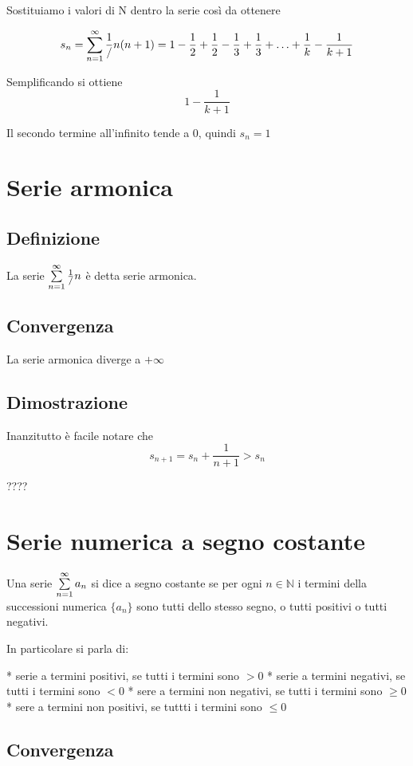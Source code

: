 Sostituiamo i valori di N dentro la serie così da ottenere

$$s_{n} = \sum\limits_{n=1}^{\infty}\frac{1}/{n(n+1)} = 1 - \frac{1}{2} + \frac{1}{2} - \frac{1}{3} + \frac{1}{3} + \ldots + \frac{1}{k} - \frac{1}{k+1}$$

Semplificando si ottiene $$1-\frac{1}{k+1}$$

Il secondo termine all'infinito tende a 0, quindi $s_{n} = 1$

\section{Serie armonica}

\subsection{Definizione}
La serie $\sum\limits_{n=1}^{\infty}\frac{1}/{n}$ è detta serie armonica.

\subsection{Convergenza}
La serie armonica diverge a $+\infty$

\subsection{Dimostrazione}
Inanzitutto è facile notare che $$s_{n+1}=s_n+\frac{1}{n+1} > s_n$$

????

\section{Serie numerica a segno costante}

Una serie $\sum\limits_{n=1}^{\infty}a_n$ si dice a segno costante se per ogni $n \in \mathbb{N}$ i termini della successioni numerica $\{a_n\}$ sono tutti dello stesso segno, o tutti positivi o tutti negativi. 

In particolare si parla di:

* serie a termini positivi, se tutti i termini sono $>0$ 
* serie a termini negativi, se tutti i termini sono $<0$
* sere a termini non negativi, se tutti i termini sono $\geq 0$
* sere a termini non positivi, se tuttti i termini sono $\leq 0$

\subsection{Convergenza }

